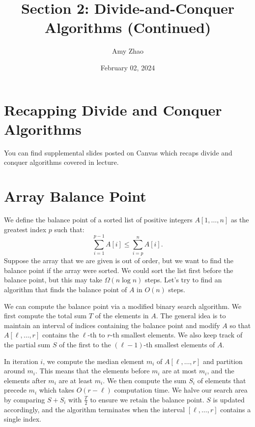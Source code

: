 \documentclass[11pt]{article}
\title{Section 2: Divide-and-Conquer Algorithms (Continued)}
\date{February 02, 2024}
\author{Amy Zhao}
\begin{document}
\renewcommand\labelitemi{$\vcenter{\hbox{\tiny$\bullet$}}$}
\renewcommand\labelitemii{$\vcenter{\hbox{\tiny$\bullet$}}$}

\maketitle

\section{Recapping Divide and Conquer Algorithms}
You can find supplemental slides posted on Canvas which recaps divide and conquer algorithms covered in lecture. 

\section{Array Balance Point}
We define the balance point of a sorted list of positive integers $A[1, \dots, n]$ as the greatest index $p$ such that:
\begin{equation}
    \sum_{i=1}^{p-1} A[i] \leq \sum_{i=p}^n A[i].
\end{equation}
Suppose the array that we are given is out of order, but we want to find the balance point if the array were sorted. We could sort the list first before the balance point, but this may take $\Omega(n \log n)$ steps. Let's try to find an algorithm that finds the balance point of $A$ in $O(n)$ steps. 

We can compute the balance point via a modified binary search algorithm. We first compute the total sum $T$ of the elements in $A$. The general idea is to maintain an interval of indices containing the balance point and modify $A$ so that $A[\ell, \dots, r]$ contains the $\ell$-th to $r$-th smallest elements. We also keep track of the partial sum $S$ of the first to the $(\ell-1)$-th smallest elements of $A$. 

In iteration $i$, we compute the median element $m_i$ of $A[\ell, \dots, r]$ and partition around $m_i$. This means that the elements before $m_i$ are at most $m_i$, and the elements after $m_i$ are at least $m_i$. We then compute the sum $S_i$ of elements that precede $m_i$ which takes $O(r - \ell)$ computation time. We halve our search area by comparing $S + S_i$ with $\frac{T}{2}$ to ensure we retain the balance point. $S$ is updated accordingly, and the algorithm terminates when the interval $[\ell, \dots, r]$ contains a single index. 
\end{document}

